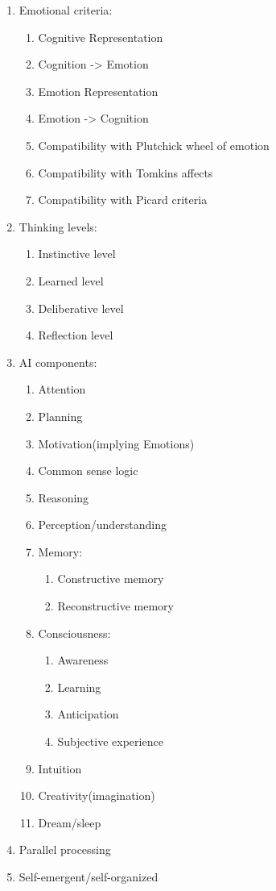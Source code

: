 \begin{enumerate}
 \item  Emotional criteria:
 \begin{enumerate}
  \item  Cognitive Representation
  \item  Cognition -> Emotion
  \item  Emotion Representation
  \item  Emotion -> Cognition
  \item  Compatibility with Plutchick wheel of emotion
  \item  Compatibility with Tomkins affects
  \item  Compatibility with Picard criteria
 \end{enumerate}
 \item  Thinking levels:
 \begin{enumerate}
  \item  Instinctive level
  \item  Learned level
  \item  Deliberative level
  \item  Reflection level
 \end{enumerate}
 \item  AI components:
 \begin{enumerate}
  \item  Attention
  \item  Planning
  \item  Motivation(implying Emotions)
  \item  Common sense logic
  \item  Reasoning
  \item  Perception/understanding
  \item  Memory:
  \begin{enumerate}
   \item  Constructive memory
   \item  Reconstructive memory
  \end{enumerate}
  \item  Consciousness:
  \begin{enumerate}
   \item  Awareness
   \item  Learning
   \item  Anticipation
   \item  Subjective experience
  \end{enumerate}
  \item  Intuition
  \item  Creativity(imagination)
  \item  Dream/sleep
 \end{enumerate}
 \item  Parallel processing
 \item  Self-emergent/self-organized
\end{enumerate}

